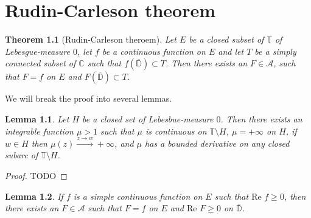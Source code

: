 \documentclass[a4paper,12pt,twoside,BCOR=10mm]{scrbook}
\newtheorem{theorem}{Theorem}
\newtheorem{lemma}{Lemma}
\renewcommand{\Re}{\text{Re }}
\begin{document}
\chapter{Rudin-Carleson theorem}
\begin{theorem}[Rudin-Carleson theroem]
Let $E$ be a closed subset of $\mathbb{T}$ of Lebesgue-measure $0$, let $f$ be a continuous function on $E$ and let $T$ be a simply connected subset of $\mathbb{C}$ such that $f(\mathbb{\overline{D}}) \subset T$.
Then there exists an $F \in \mathcal{A}$, such that $F = f$ on $E$ and $F(\mathbb{\overline{D}}) \subset T$. %
\end{theorem}
We will break the proof into several lemmas.  %
\begin{lemma}
Let $H$ be a closed set of Lebesbue-measure $0$.
Then there exists an integrable function $\mu > 1$ such that
	$\mu$ is continuous on $\mathbb{T} \setminus H$,
	$\mu = +\infty$ on $H$,
	if $w \in H$ then $\mu(z) \xrightarrow{z \rightarrow w} +\infty$, and
	$\mu$ has a bounded derivative on any closed subarc of $\mathbb{T} \setminus H$.
\end{lemma}
\begin{proof}
TODO
\end{proof}
\begin{lemma}
If $f$ is a simple continuous function on $E$ such that $\Re f \geq 0$, then there exists an $F \in \mathcal{A}$ such that $F = f$ on $E$ and $\Re F \geq 0$ on $\overline{\mathbb{D}}$.
\end{lemma}
\end{document}
